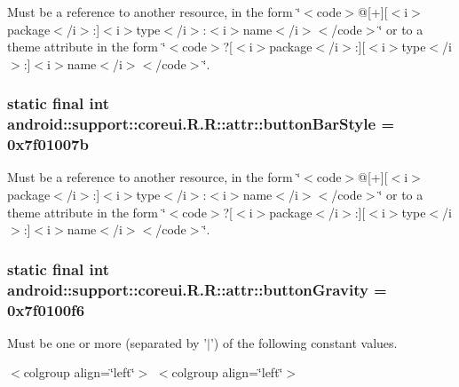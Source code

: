 Must be a reference to another resource, in the form \char`\"{}$<$code$>$@\mbox{[}+\mbox{]}\mbox{[}$<$i$>$package$<$/i$>$:\mbox{]}$<$i$>$type$<$/i$>$:$<$i$>$name$<$/i$>$$<$/code$>$\char`\"{} or to a theme attribute in the form \char`\"{}$<$code$>$?\mbox{[}$<$i$>$package$<$/i$>$:\mbox{]}\mbox{[}$<$i$>$type$<$/i$>$:\mbox{]}$<$i$>$name$<$/i$>$$<$/code$>$\char`\"{}. \hypertarget{classandroid_1_1support_1_1coreui_1_1_r_1_1attr_3d13c596f07010e302bf0f4057212510}{
\subsubsection[{buttonBarStyle}]{\setlength{\rightskip}{0pt plus 5cm}static final int android::support::coreui.R.R::attr::buttonBarStyle = 0x7f01007b}}
\label{classandroid_1_1support_1_1coreui_1_1_r_1_1attr_3d13c596f07010e302bf0f4057212510}


Must be a reference to another resource, in the form \char`\"{}$<$code$>$@\mbox{[}+\mbox{]}\mbox{[}$<$i$>$package$<$/i$>$:\mbox{]}$<$i$>$type$<$/i$>$:$<$i$>$name$<$/i$>$$<$/code$>$\char`\"{} or to a theme attribute in the form \char`\"{}$<$code$>$?\mbox{[}$<$i$>$package$<$/i$>$:\mbox{]}\mbox{[}$<$i$>$type$<$/i$>$:\mbox{]}$<$i$>$name$<$/i$>$$<$/code$>$\char`\"{}. \hypertarget{classandroid_1_1support_1_1coreui_1_1_r_1_1attr_f8da6a004d87d6c5fef3e16cdad6870c}{
\subsubsection[{buttonGravity}]{\setlength{\rightskip}{0pt plus 5cm}static final int android::support::coreui.R.R::attr::buttonGravity = 0x7f0100f6}}
\label{classandroid_1_1support_1_1coreui_1_1_r_1_1attr_f8da6a004d87d6c5fef3e16cdad6870c}


Must be one or more (separated by '$|$') of the following constant values. \begin{TabularC}{0}
\hline
\end{TabularC}
$<$colgroup align=\char`\"{}left\char`\"{}$>$ $<$colgroup align=\char`\"{}left\char`\"{}$>$ 

